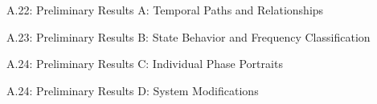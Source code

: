 \documentclass[final]{beamer}
\newlength{\onecolwid}
\newlength{\twocolwid}
\theoremstyle{definition}
\begin{document}
\begin{frame}[t]
\begin{columns}[t]
\begin{column}{\twocolwid}
\begin{columns}[t,totalwidth=\twocolwid]

\begin{column}{\onecolwid} %
	
\begin{alertblock}{A.22: Preliminary Results A: Temporal Paths and Relationships}

\end{alertblock}


\begin{alertblock}{A.23: Preliminary Results B: State Behavior and Frequency Classification }

\end{alertblock}
\begin{alertblock}{A.24: Preliminary Results C: Individual Phase Portraits}

\end{alertblock}

\begin{alertblock}{A.24: Preliminary Results D: System Modifications}

\end{alertblock}
\end{column} %
\end{columns} %
\end{column} %


\end{columns}
\end{frame}
\end{document}
